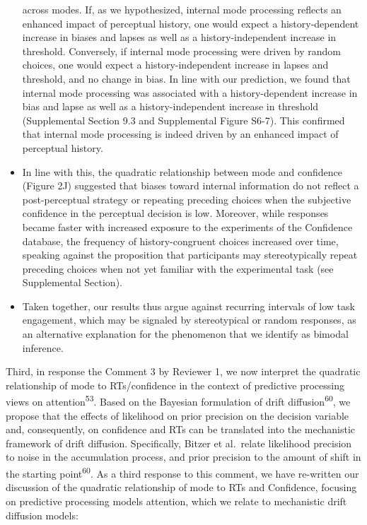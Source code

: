 \documentclass[
]{article}
\begin{document}
\begin{itemize}
  across modes. If, as we hypothesized, internal mode processing
  reflects an enhanced impact of perceptual history, one would expect a
  history-dependent increase in biases and lapses as well as a
  history-independent increase in threshold. Conversely, if internal
  mode processing were driven by random choices, one would expect a
  history-independent increase in lapses and threshold, and no change in
  bias. In line with our prediction, we found that internal mode
  processing was associated with a history-dependent increase in bias
  and lapse as well as a history-independent increase in threshold
  (Supplemental Section 9.3 and Supplemental Figure S6-7). This
  confirmed that internal mode processing is indeed driven by an
  enhanced impact of perceptual history.
\item
  In line with this, the quadratic relationship between mode and
  confidence (Figure 2J) suggested that biases toward internal
  information do not reflect a post-perceptual strategy or repeating
  preceding choices when the subjective confidence in the perceptual
  decision is low. Moreover, while responses became faster with
  increased exposure to the experiments of the Confidence database, the
  frequency of history-congruent choices increased over time, speaking
  against the proposition that participants may stereotypically repeat
  preceding choices when not yet familiar with the experimental task
  (see Supplemental Section).
\item
  Taken together, our results thus argue against recurring intervals of
  low task engagement, which may be signaled by stereotypical or random
  responses, as an alternative explanation for the phenomenon that we
  identify as bimodal inference.
\end{itemize}

Third, in response the Comment 3 by Reviewer 1, we now interpret the
quadratic relationship of mode to RTs/confidence in the context of
predictive processing views on attention\textsuperscript{53}. Based on
the Bayesian formulation of drift diffusion\textsuperscript{60}, we
propose that the effects of likelihood on prior precision on the
decision variable and, consequently, on confidence and RTs can be
translated into the mechanistic framework of drift diffusion.
Specifically, Bitzer et al.~relate likelihood precision to noise in the
accumulation process, and prior precision to the amount of shift in the
starting point\textsuperscript{60}. As a third response to this comment,
we have re-written our discussion of the quadratic relationship of mode
to RTs and Confidence, focusing on predictive processing models
attention, which we relate to mechanistic drift diffusion models:
\end{document}
